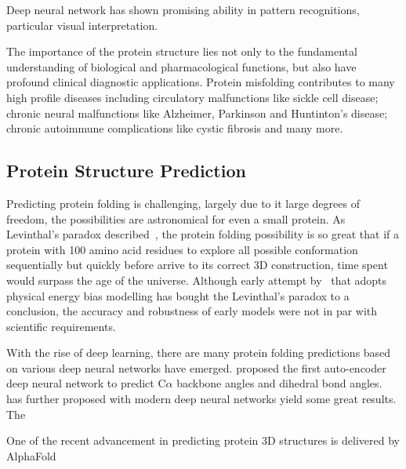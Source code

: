 Deep neural network has shown promising ability in pattern recognitions, particular visual interpretation.
\par 
The importance of the protein structure lies not only to the fundamental understanding of biological and pharmacological functions, but also have profound clinical diagnostic applications. Protein misfolding contributes to many high profile diseases including circulatory malfunctions like sickle cell disease; chronic neural malfunctions like Alzheimer, Parkinson and Huntinton's disease; chronic autoimmune complications like cystic fibrosis and many more.~\cite{Hammarstrom_2003,Chiti_2006,Selkoe_2003}  
\par 

\subsection{Protein Structure Prediction}
Predicting protein folding is challenging, largely due to it large degrees of freedom, the possibilities are astronomical for even a small protein. As Levinthal's paradox described~\cite{LEV69}, the protein folding possibility is so great that if a protein with 100 amino acid residues to explore all possible conformation sequentially but quickly before arrive to its correct 3D construction, time spent would surpass the age of the universe. Although early attempt by~\citet{Zwanzig_1992} that adopts physical energy bias modelling has bought the Levinthal's paradox to a conclusion, the accuracy and robustness of early models were not in par with scientific requirements.  
\par 
With the rise of deep learning, there are many protein folding predictions based on various deep neural networks have emerged. \citet{Lyons_2014} proposed the first auto-encoder deep neural network to predict C$\alpha$ backbone angles and dihedral bond angles.~\citet{Heffernan_2015} has further proposed with modern deep neural networks yield some great results. The 

One of the recent advancement in predicting protein 3D structures is delivered by AlphaFold